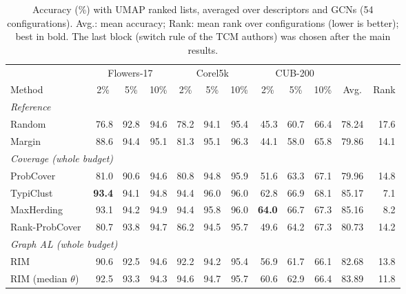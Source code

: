 \begin{table}[t]
\centering
\caption{Accuracy (\%) with UMAP ranked lists, averaged over descriptors and GCNs (54 configurations). Avg.: mean accuracy; Rank: mean rank over configurations (lower is better); best in bold. The last block (switch rule of the TCM authors) was chosen after the main results.}
\label{tab:sota-umap}
\footnotesize
\begin{adjustbox}{max width=\textwidth}
\begin{tabular}{lrrrrrrrrrrr}
\toprule
& \multicolumn{3}{c}{Flowers-17} & \multicolumn{3}{c}{Corel5k} & \multicolumn{3}{c}{CUB-200} & & \\
\cmidrule(lr){2-4}\cmidrule(lr){5-7}\cmidrule(lr){8-10}
Method & \multicolumn{1}{c}{2\%} & \multicolumn{1}{c}{5\%} & \multicolumn{1}{c}{10\%} & \multicolumn{1}{c}{2\%} & \multicolumn{1}{c}{5\%} & \multicolumn{1}{c}{10\%} & \multicolumn{1}{c}{2\%} & \multicolumn{1}{c}{5\%} & \multicolumn{1}{c}{10\%} & \multicolumn{1}{c}{Avg.} & \multicolumn{1}{c}{Rank} \\
\midrule
\multicolumn{12}{l}{\textit{Reference}} \\
\quad Random & 76.8 & 92.8 & 94.6 & 78.2 & 94.1 & 95.4 & 45.3 & 60.7 & 66.4 & 78.24 & 17.6 \\
\quad Margin~\cite{scheffer2001active} & 88.6 & 94.4 & 95.1 & 81.3 & 95.1 & 96.3 & 44.1 & 58.0 & 65.8 & 79.86 & 14.1 \\
\multicolumn{12}{l}{\textit{Coverage (whole budget)}} \\
\quad ProbCover~\cite{yehuda2022active} & 81.0 & 90.6 & 94.6 & 80.8 & 94.8 & 95.9 & 51.6 & 63.3 & 67.1 & 79.96 & 14.8 \\
\quad TypiClust~\cite{hacohen2022active} & \textbf{93.4} & 94.1 & 94.8 & 94.4 & 96.0 & 96.0 & 62.8 & 66.9 & 68.1 & 85.17 & 7.1 \\
\quad MaxHerding~\cite{bae2024generalized} & 93.1 & 94.2 & 94.9 & 94.4 & 95.8 & 96.0 & \textbf{64.0} & 66.7 & 67.3 & 85.16 & 8.2 \\
\quad Rank-ProbCover & 80.7 & 93.8 & 94.7 & 86.2 & 94.5 & 95.7 & 49.6 & 64.2 & 67.3 & 80.73 & 14.2 \\
\multicolumn{12}{l}{\textit{Graph AL (whole budget)}} \\
\quad RIM~\cite{zhang2021rim} & 90.6 & 92.5 & 94.6 & 92.2 & 94.2 & 95.4 & 56.9 & 61.7 & 66.1 & 82.68 & 13.8 \\
\quad RIM (median $\theta$)~\cite{zhang2021rim} & 92.5 & 93.3 & 94.3 & 94.6 & 94.7 & 95.7 & 60.6 & 62.9 & 66.4 & 83.89 & 11.8 \\

\end{tabular}
\end{adjustbox}
\end{table}
